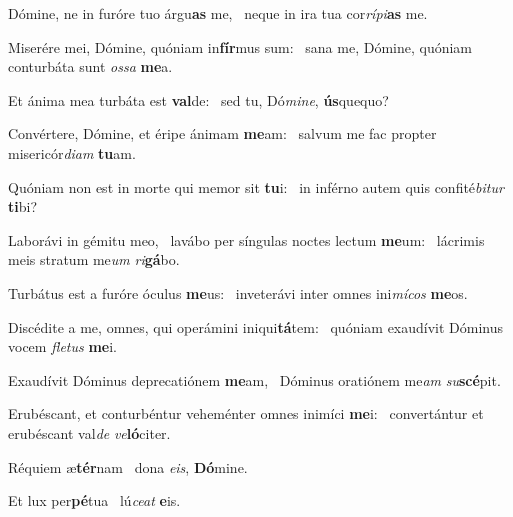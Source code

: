 \item Dómine, ne in furóre tuo árgu\textbf{as} me,~\psstar{} neque in ira tua cor\textit{rípi}\textbf{as} me.
\item Miserére mei, Dómine, quóniam in\textbf{fír}mus sum:~\psstar{} sana me, Dómine, quóniam conturbáta sunt \textit{ossa} \textbf{me}a.
\item Et ánima mea turbáta est \textbf{val}de:~\psstar{} sed tu, Dó\textit{mine}, \textbf{ús}quequo?
\item Convértere, Dómine, et éripe ánimam \textbf{me}am:~\psstar{} salvum me fac propter misericór\textit{diam} \textbf{tu}am.
\item Quóniam non est in morte qui memor sit \textbf{tu}i:~\psstar{} in inférno autem quis confité\textit{bitur} \textbf{ti}bi?
\item Laborávi in gémitu meo,~\pscross{} la\-vábo per síngulas noctes lectum \textbf{me}um:~\psstar{} lácrimis meis stratum me\textit{um} \textit{ri}\textbf{gá}bo.
\item Turbátus est a furóre óculus \textbf{me}us:~\psstar{} inveterávi inter omnes ini\textit{mícos} \textbf{me}os.
\item Discédite a me, omnes, qui operámini iniqui\textbf{tá}tem:~\psstar{} quóniam exaudívit Dóminus vocem \textit{fletus} \textbf{me}i.
\item Exaudívit Dóminus deprecatiónem \textbf{me}am,~\psstar{} Dóminus oratiónem me\textit{am} \textit{su}\textbf{scé}pit.
\item Erubéscant, et conturbéntur veheménter omnes inimíci \textbf{me}i:~\psstar{} convertántur et erubéscant val\textit{de} \textit{ve}\textbf{ló}citer.
\item Réquiem æ\textbf{tér}nam~\psstar{} dona \textit{eis}, \textbf{Dó}mine.
\item Et lux per\textbf{pé}tua~\psstar{} lú\textit{ceat} \textbf{e}is.
